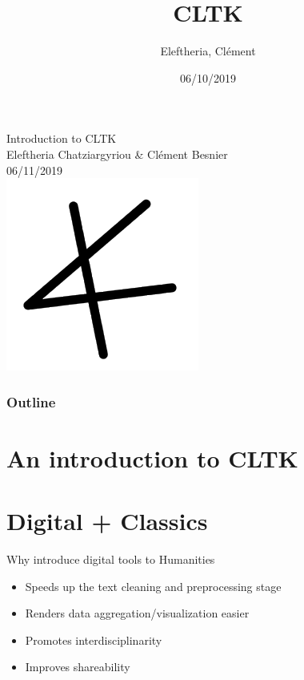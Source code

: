 \documentclass{beamer}
\title{CLTK}
\author{Eleftheria, Clément}
\institute{CLTK}
\date{06/10/2019}
\begin{document}
\begin{frame}
\begin{center}
    {\large Introduction to CLTK}\\
    Eleftheria Chatziargyriou \& Clément Besnier \\
    06/11/2019 \\
    \includegraphics[scale=0.5]{cltklogo.png}
\end{center}

\end{frame}

\begin{frame}
\frametitle{Outline}
\tableofcontents
\end{frame}

\section{An introduction to CLTK}


\section{Digital + Classics}
\begin{frame}{Why introduce digital tools to Humanities}
\begin{itemize}
    \item Speeds up the text cleaning and preprocessing stage
    \item Renders data aggregation/visualization easier
    \item Promotes interdisciplinarity
    \item Improves shareability
\end{itemize}{}
    
\end{frame}
\end{document}
